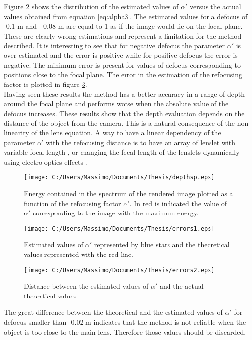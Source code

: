  \\
 \\
Figure \ref{fig:error} shows the distribution of the estimated values of $ \alpha'$ versus the actual values obtained from equation \ref{eq:alpha3}.
 The estimated values for a defocus of -0.1 m and - 0.08 m are equal to 1 as if the image would lie on the focal plane. These are clearly wrong estimations and represent a limitation for the method described. It is interesting to see that for negative defocus the parameter $ \alpha'$ is over estimated and the error is positive while for positive defocus the error is negative. The minimum error is present for values of defocus corresponding to positions close to the focal plane. The error in the estimation of the refocusing factor is plotted in figure \ref{fig:error1}.
 \\
 Having seen these results the method has a better accuracy in a range of depth around the focal plane and performs worse when the absolute value of the defocus increases.
 These results show that the depth evaluation depends on the distance of the object from the camera. This is a natural consequence of the non linearity of the lens equation. A way to have a linear dependency of the parameter $ \alpha'$ with the refocusing distance is to have an array of lenslet with variable focal length \cite{wetzstein2011computational,georgiev2012multifocus}, or changing the focal length of the lenslets dynamically using electro optics effects \cite{ueda2008multi}.
 \begin{figure}[H]
 	\centering
 	\texttt{[image: C:/Users/Massimo/Documents/Thesis/depthsp.eps]}
 	\caption{\label{fig:maxima} Energy contained in the spectrum of the rendered image plotted as a function of the refocusing factor $ \alpha'$. In red is indicated the value of $ \alpha'$ corresponding to the image with the maximum energy. }
 \end{figure}
\begin{figure}[H]
	\centering
	\texttt{[image: C:/Users/Massimo/Documents/Thesis/errors1.eps]}
	\caption{\label{fig:error} Estimated values of $ \alpha'$ represented by blue stars and the theoretical values represented with the red line. }
\end{figure}
\begin{figure}[H]
	\centering
	\texttt{[image: C:/Users/Massimo/Documents/Thesis/errors2.eps]}
	\caption{\label{fig:error1} Distance between the estimated values of $ \alpha'$ and the actual theoretical values. }
\end{figure}
The great difference between the theoretical and the estimated values of $\alpha'$ for defocus smaller than -0.02 m indicates that the method is not reliable when the object is too close to the main lens. Therefore those values should be discarded.
